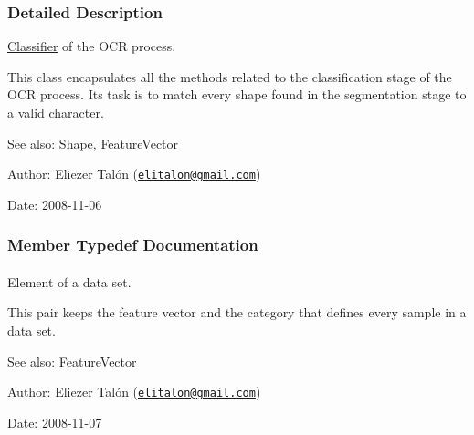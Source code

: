 \subsubsection{Detailed Description}
\hyperlink{class_classifier}{Classifier} of the OCR process. 

This class encapsulates all the methods related to the classification stage of the OCR process. Its task is to match every shape found in the segmentation stage to a valid character.

\begin{Desc}
\item[See also:]\hyperlink{class_shape}{Shape}, FeatureVector\end{Desc}
\begin{Desc}
\item[Author:]Eliezer Talón (\href{mailto:elitalon@gmail.com}{\tt elitalon@gmail.com}) \end{Desc}
\begin{Desc}
\item[Date:]2008-11-06 \end{Desc}


\subsubsection{Member Typedef Documentation}
\hypertarget{class_classifier_3487f0cd88135d7782cf4a460e221e9e}{
\paragraph[{DatasetElement}]{}\hfill}
\label{class_classifier_3487f0cd88135d7782cf4a460e221e9e}


Element of a data set. 

This pair keeps the feature vector and the category that defines every sample in a data set.

\begin{Desc}
\item[See also:]FeatureVector\end{Desc}
\begin{Desc}
\item[Author:]Eliezer Talón (\href{mailto:elitalon@gmail.com}{\tt elitalon@gmail.com}) \end{Desc}
\begin{Desc}
\item[Date:]2008-11-07 \end{Desc}


